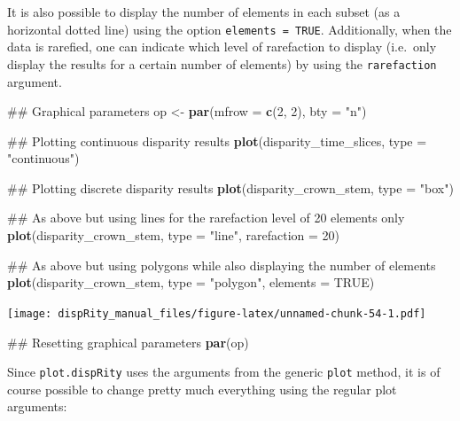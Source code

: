 \documentclass[]{book}
\newenvironment{Shaded}{\begin{snugshade}}{\end{snugshade}}
\newcommand{\KeywordTok}[1]{\textcolor[rgb]{0.13,0.29,0.53}{\textbf{#1}}}
\newcommand{\DataTypeTok}[1]{\textcolor[rgb]{0.13,0.29,0.53}{#1}}
\newcommand{\DecValTok}[1]{\textcolor[rgb]{0.00,0.00,0.81}{#1}}
\newcommand{\StringTok}[1]{\textcolor[rgb]{0.31,0.60,0.02}{#1}}
\newcommand{\OtherTok}[1]{\textcolor[rgb]{0.56,0.35,0.01}{#1}}
\newcommand{\NormalTok}[1]{#1}
\theoremstyle{definition}
\theoremstyle{definition}
\theoremstyle{definition}
\theoremstyle{remark}
\begin{document}
It is also possible to display the number of elements in each subset (as
a horizontal dotted line) using the option \texttt{elements\ =\ TRUE}.
Additionally, when the data is rarefied, one can indicate which level of
rarefaction to display (i.e.~only display the results for a certain
number of elements) by using the \texttt{rarefaction} argument.

\begin{Shaded}
\begin{Highlighting}[]
\NormalTok{## Graphical parameters}
\NormalTok{op <-}\StringTok{ }\KeywordTok{par}\NormalTok{(}\DataTypeTok{mfrow =} \KeywordTok{c}\NormalTok{(}\DecValTok{2}\NormalTok{, }\DecValTok{2}\NormalTok{), }\DataTypeTok{bty =} \StringTok{"n"}\NormalTok{)}

\NormalTok{## Plotting continuous disparity results}
\KeywordTok{plot}\NormalTok{(disparity_time_slices, }\DataTypeTok{type =} \StringTok{"continuous"}\NormalTok{)}

\NormalTok{## Plotting discrete disparity results}
\KeywordTok{plot}\NormalTok{(disparity_crown_stem, }\DataTypeTok{type =} \StringTok{"box"}\NormalTok{)}

\NormalTok{## As above but using lines for the rarefaction level of 20 elements only}
\KeywordTok{plot}\NormalTok{(disparity_crown_stem, }\DataTypeTok{type =} \StringTok{"line"}\NormalTok{, }\DataTypeTok{rarefaction =} \DecValTok{20}\NormalTok{)}

\NormalTok{## As above but using polygons while also displaying the number of elements}
\KeywordTok{plot}\NormalTok{(disparity_crown_stem, }\DataTypeTok{type =} \StringTok{"polygon"}\NormalTok{, }\DataTypeTok{elements =} \OtherTok{TRUE}\NormalTok{)}
\end{Highlighting}
\end{Shaded}

\texttt{[image: dispRity\_manual\_files/figure-latex/unnamed-chunk-54-1.pdf]}

\begin{Shaded}
\begin{Highlighting}[]
\NormalTok{## Resetting graphical parameters}
\KeywordTok{par}\NormalTok{(op)}
\end{Highlighting}
\end{Shaded}

Since \texttt{plot.dispRity} uses the arguments from the generic
\texttt{plot} method, it is of course possible to change pretty much
everything using the regular plot arguments:
\end{document}
